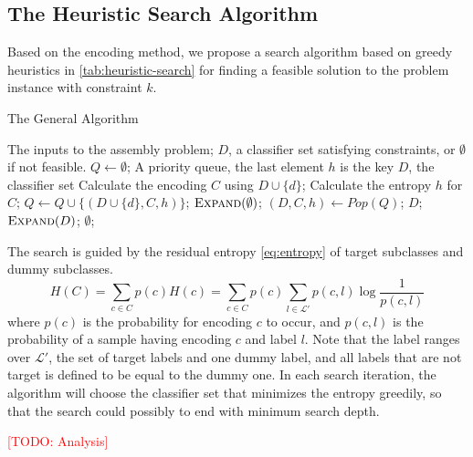 \documentclass[sigplan,10pt,review]{acmart}\settopmatter{printfolios=true,printccs=false,printacmref=false}
\newcommand{\todo}[1]{\textcolor{red}{[TODO: #1]}}
\begin{document}
\subsection{The Heuristic Search Algorithm}
\label{sec:assembly-algorithm}
Based on the encoding method, we propose a search algorithm based on greedy heuristics in \cref{tab:heuristic-search} for finding a feasible solution to the problem instance with constraint $k$.

\begin{algorithm}[h]
	\caption{The General Algorithm}
	\label{tab:heuristic-search}
	\begin{algorithmic}[1]
		\Require The inputs to the assembly problem;
		\Ensure $D$, a classifier set satisfying constraints, or $\emptyset$ if not feasible.
		\State $Q \gets \emptyset$; \Comment A priority queue, the last element $h$ is the key
		 \Comment $D$, the classifier set
				\State Calculate the encoding $C$ using $D \cup \{d\}$;
				\State Calculate the entropy $h$ for $C$;
				\State $Q \gets Q \cup \{(D \cup \{d\}, C, h)\}$;
			\EndFor
		\EndFunction
			\State $\Call{Expand}{\emptyset}$;
				\State $(D, C, h) \gets Pop(Q)$;
					\State \Return $D$;
				\EndIf
					\State $\Call{Expand}{D}$;
				\EndIf
			\EndWhile
			\State \Return $\emptyset$;
		\EndFunction
	\end{algorithmic}
\end{algorithm}

The search is guided by the residual entropy \eqref{eq:entropy} of target subclasses and dummy subclasses.
\begin{equation}
	H(C) = \sum_{c \in C} p(c)H(c) = \sum_{c \in C} p(c)\sum_{l \in \mathcal{L}'} p(c, l)\log\frac{1}{p(c, l)}
	\label{eq:entropy}
\end{equation}
where $p(c)$ is the probability for encoding $c$ to occur, and $p(c, l)$ is the probability of a sample having encoding $c$ and label $l$.
Note that the label ranges over $\mathcal{L}'$, the set of target labels and one dummy label, and all labels that are not target is defined to be equal to the dummy one.
In each search iteration, the algorithm will choose the classifier set that minimizes the entropy greedily, so that the search could possibly to end with minimum search depth.

\todo{Analysis}
\end{document}
